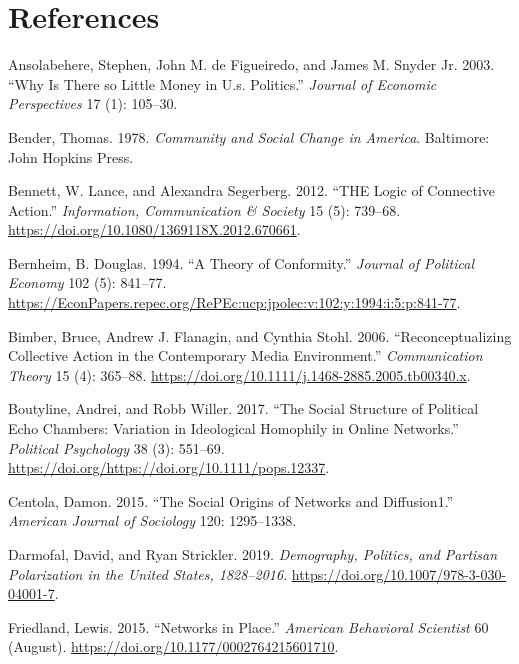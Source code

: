 \documentclass[12pt,]{article}
\begin{document}
\hypertarget{references}{%
\section*{References}\label{references}}

\hypertarget{refs}{}
\leavevmode\hypertarget{ref-ansolabehere2003}{}%
Ansolabehere, Stephen, John M. de Figueiredo, and James M. Snyder Jr.
2003. ``Why Is There so Little Money in U.s. Politics.'' \emph{Journal
of Economic Perspectives} 17 (1): 105--30.

\leavevmode\hypertarget{ref-bender1978}{}%
Bender, Thomas. 1978. \emph{Community and Social Change in America}.
Baltimore: John Hopkins Press.

\leavevmode\hypertarget{ref-bennett2012}{}%
Bennett, W. Lance, and Alexandra Segerberg. 2012. ``THE Logic of
Connective Action.'' \emph{Information, Communication \& Society} 15
(5): 739--68. \url{https://doi.org/10.1080/1369118X.2012.670661}.

\leavevmode\hypertarget{ref-bernheim1994}{}%
Bernheim, B. Douglas. 1994. ``A Theory of Conformity.'' \emph{Journal of
Political Economy} 102 (5): 841--77.
\url{https://EconPapers.repec.org/RePEc:ucp:jpolec:v:102:y:1994:i:5:p:841-77}.

\leavevmode\hypertarget{ref-bimber2006}{}%
Bimber, Bruce, Andrew J. Flanagin, and Cynthia Stohl. 2006.
``Reconceptualizing Collective Action in the Contemporary Media
Environment.'' \emph{Communication Theory} 15 (4): 365--88.
\url{https://doi.org/10.1111/j.1468-2885.2005.tb00340.x}.

\leavevmode\hypertarget{ref-boutyline2017}{}%
Boutyline, Andrei, and Robb Willer. 2017. ``The Social Structure of
Political Echo Chambers: Variation in Ideological Homophily in Online
Networks.'' \emph{Political Psychology} 38 (3): 551--69.
\url{https://doi.org/https://doi.org/10.1111/pops.12337}.

\leavevmode\hypertarget{ref-centola2015}{}%
Centola, Damon. 2015. ``The Social Origins of Networks and Diffusion1.''
\emph{American Journal of Sociology} 120: 1295--1338.

\leavevmode\hypertarget{ref-darmofal2019}{}%
Darmofal, David, and Ryan Strickler. 2019. \emph{Demography, Politics,
and Partisan Polarization in the United States, 1828--2016}.
\url{https://doi.org/10.1007/978-3-030-04001-7}.

\leavevmode\hypertarget{ref-friedland2015}{}%
Friedland, Lewis. 2015. ``Networks in Place.'' \emph{American Behavioral
Scientist} 60 (August). \url{https://doi.org/10.1177/0002764215601710}.
\end{document}
